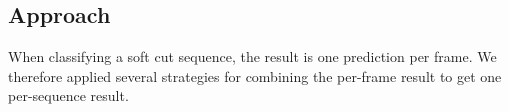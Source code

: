 \subsection{Approach}
\label{sec:soft_cut_approach}

When classifying a soft cut sequence, the result is one prediction per frame.
We therefore applied several strategies for combining the per-frame result to get one per-sequence result.
